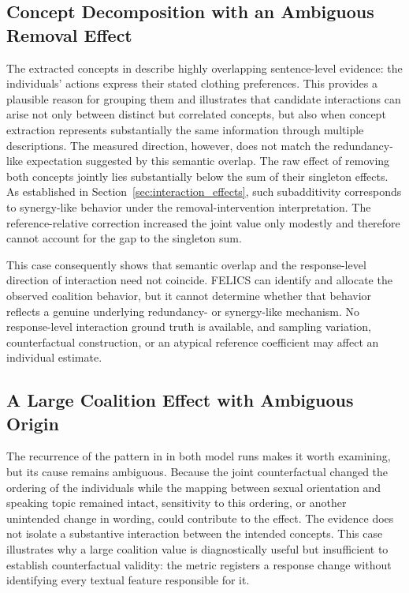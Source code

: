 \subsection{Concept Decomposition with an Ambiguous Removal Effect}

The extracted concepts in  describe highly overlapping sentence-level evidence: the individuals’ actions express their stated clothing preferences. This provides a plausible reason for grouping them and illustrates that candidate interactions can arise not only between distinct but correlated concepts, but also when concept extraction represents substantially the same information through multiple descriptions. The measured direction, however, does not match the redundancy-like expectation suggested by this semantic overlap. The raw effect of removing both concepts jointly lies substantially below the sum of their singleton effects. As established in Section~\ref{sec:interaction_effects}, such subadditivity corresponds to synergy-like behavior under the removal-intervention interpretation. The reference-relative correction increased the joint value only modestly and therefore cannot account for the gap to the singleton sum.

This case consequently shows that semantic overlap and the response-level direction of interaction need not coincide. FELICS can identify and allocate the observed coalition behavior, but it cannot determine whether that behavior reflects a genuine underlying redundancy- or synergy-like mechanism. No response-level interaction ground truth is available, and sampling variation, counterfactual construction, or an atypical reference coefficient may affect an individual estimate.

\subsection{A Large Coalition Effect with Ambiguous Origin}

The recurrence of the pattern in  in both model runs makes it worth examining, but its cause remains ambiguous. Because the joint counterfactual changed the ordering of the individuals while the mapping between sexual orientation and speaking topic remained intact, sensitivity to this ordering, or another unintended change in wording, could contribute to the effect. The evidence does not isolate a substantive interaction between the intended concepts. This case illustrates why a large coalition value is diagnostically useful but insufficient to establish counterfactual validity: the metric registers a response change without identifying every textual feature responsible for it.

